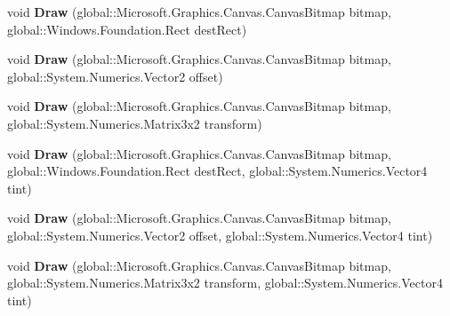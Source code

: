 \begin{DoxyCompactItemize}
void {\bfseries Draw} (global\+::\+Microsoft.\+Graphics.\+Canvas.\+Canvas\+Bitmap bitmap, global\+::\+Windows.\+Foundation.\+Rect dest\+Rect)
\item 
\mbox{\label{class_microsoft_1_1_graphics_1_1_canvas_1_1_canvas_sprite_batch_a8d4101527222c749dcfd590c5306aeb7}} 
void {\bfseries Draw} (global\+::\+Microsoft.\+Graphics.\+Canvas.\+Canvas\+Bitmap bitmap, global\+::\+System.\+Numerics.\+Vector2 offset)
\item 
\mbox{\label{class_microsoft_1_1_graphics_1_1_canvas_1_1_canvas_sprite_batch_a65cba582c2a39f5ba39b6b335f662889}} 
void {\bfseries Draw} (global\+::\+Microsoft.\+Graphics.\+Canvas.\+Canvas\+Bitmap bitmap, global\+::\+System.\+Numerics.\+Matrix3x2 transform)
\item 
\mbox{\label{class_microsoft_1_1_graphics_1_1_canvas_1_1_canvas_sprite_batch_ac6a57c21e98d51e115cc80bfc708824f}} 
void {\bfseries Draw} (global\+::\+Microsoft.\+Graphics.\+Canvas.\+Canvas\+Bitmap bitmap, global\+::\+Windows.\+Foundation.\+Rect dest\+Rect, global\+::\+System.\+Numerics.\+Vector4 tint)
\item 
\mbox{\label{class_microsoft_1_1_graphics_1_1_canvas_1_1_canvas_sprite_batch_af83f6d164806efe2c3b5584aacf35266}} 
void {\bfseries Draw} (global\+::\+Microsoft.\+Graphics.\+Canvas.\+Canvas\+Bitmap bitmap, global\+::\+System.\+Numerics.\+Vector2 offset, global\+::\+System.\+Numerics.\+Vector4 tint)
\item 
\mbox{\label{class_microsoft_1_1_graphics_1_1_canvas_1_1_canvas_sprite_batch_a37f363ad9485bacdf1870d5fcac66390}} 
void {\bfseries Draw} (global\+::\+Microsoft.\+Graphics.\+Canvas.\+Canvas\+Bitmap bitmap, global\+::\+System.\+Numerics.\+Matrix3x2 transform, global\+::\+System.\+Numerics.\+Vector4 tint)
\item 
\mbox{\label{class_microsoft_1_1_graphics_1_1_canvas_1_1_canvas_sprite_batch_a539c34e4dd073937d6e282aff3ac5fa3}} 

\end{DoxyCompactItemize}

